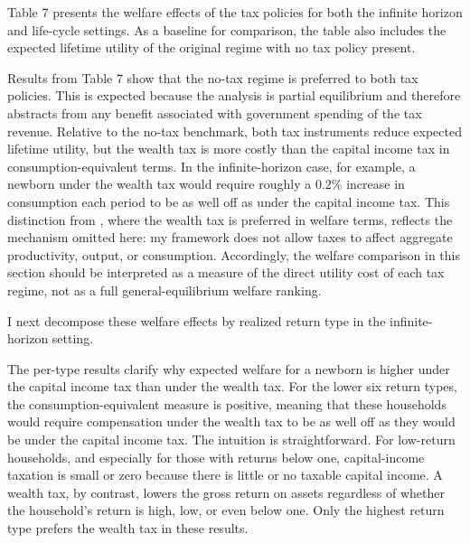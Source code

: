 \par Table 7 presents the welfare effects of the tax policies for both the infinite horizon and life-cycle settings. As a baseline for comparison, the table also includes the expected lifetime utility of the original regime with no tax policy present. 



\par Results from Table 7 show that the no-tax regime is preferred to both tax policies. This is expected because the analysis is partial equilibrium and therefore abstracts from any benefit associated with government spending of the tax revenue. Relative to the no-tax benchmark, both tax instruments reduce expected lifetime utility, but the wealth tax is more costly than the capital income tax in consumption-equivalent terms. In the infinite-horizon case, for example, a newborn under the wealth tax would require roughly a $0.2\%$ increase in consumption each period to be as well off as under the capital income tax. This distinction from \cite{Guvenen2023}, where the wealth tax is preferred in welfare terms, reflects the mechanism omitted here: my framework does not allow taxes to affect aggregate productivity, output, or consumption. Accordingly, the welfare comparison in this section should be interpreted as a measure of the direct utility cost of each tax regime, not as a full general-equilibrium welfare ranking.

\par I next decompose these welfare effects by realized return type in the infinite-horizon setting.

\par The per-type results clarify why expected welfare for a newborn is higher under the capital income tax than under the wealth tax. For the lower six return types, the consumption-equivalent measure is positive, meaning that these households would require compensation under the wealth tax to be as well off as they would be under the capital income tax. The intuition is straightforward. For low-return households, and especially for those with returns below one, capital-income taxation is small or zero because there is little or no taxable capital income. A wealth tax, by contrast, lowers the gross return on assets regardless of whether the household's return is high, low, or even below one. Only the highest return type prefers the wealth tax in these results.




